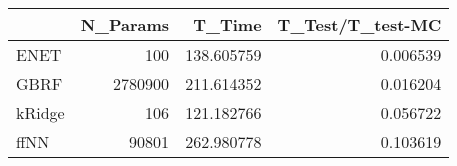 \begin{tabular}{lrrr}
\toprule
{} &  N\_Params &      T\_Time &  T\_Test/T\_test-MC \\
\midrule
ENET   &       100 &  138.605759 &          0.006539 \\
GBRF   &   2780900 &  211.614352 &          0.016204 \\
kRidge &       106 &  121.182766 &          0.056722 \\
ffNN   &     90801 &  262.980778 &          0.103619 \\
\bottomrule
\end{tabular}
